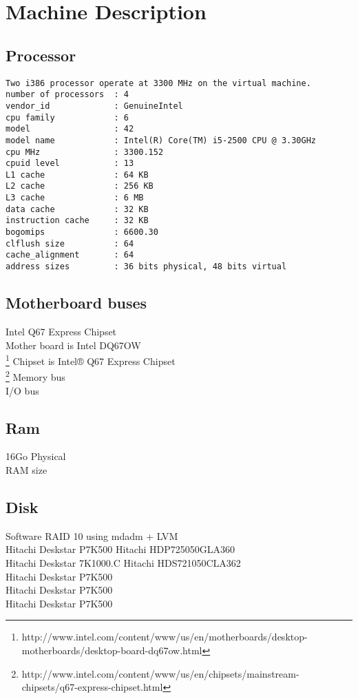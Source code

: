 \section{Machine Description}

\subsection{Processor}

\begin{verbatim}
Two i386 processor operate at 3300 MHz on the virtual machine. 
number of processors  : 4
vendor_id             : GenuineIntel
cpu family            : 6
model                 : 42
model name            : Intel(R) Core(TM) i5-2500 CPU @ 3.30GHz
cpu MHz               : 3300.152
cpuid level           : 13
L1 cache              : 64 KB
L2 cache              : 256 KB
L3 cache              : 6 MB
data cache            : 32 KB
instruction cache     : 32 KB
bogomips              : 6600.30
clflush size          : 64
cache_alignment       : 64
address sizes         : 36 bits physical, 48 bits virtual
\end{verbatim}

\subsection{Motherboard buses}
	Intel Q67 Express Chipset\\
	Mother board is Intel DQ67OW\\
\footnote{http://www.intel.com/content/www/us/en/motherboards/desktop-motherboards/desktop-board-dq67ow.html}
	Chipset is Intel® Q67 Express Chipset\\ \footnote{http://www.intel.com/content/www/us/en/chipsets/mainstream-chipsets/q67-express-chipset.html}
    	Memory bus\\
	I/O bus\\

\subsection{Ram}
	16Go Physical\\
    	RAM size\\

\subsection{Disk}
	Software RAID 10 using mdadm + LVM\\
Hitachi Deskstar P7K500 Hitachi HDP725050GLA360\\
Hitachi Deskstar 7K1000.C Hitachi HDS721050CLA362\\
Hitachi Deskstar P7K500\\
Hitachi Deskstar P7K500\\
Hitachi Deskstar P7K500\\

